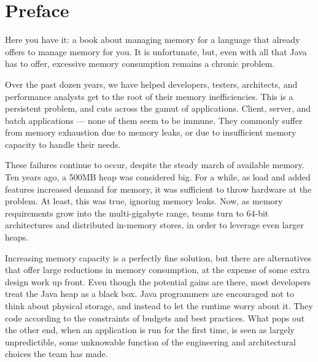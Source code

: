 \chapter*{Preface}
\label{chapter:preface}

Here you have it: a book about managing memory for a language that already
offers to manage memory for you. It is unfortunate, but, even with all that Java
has to offer, excessive memory consumption remains a chronic problem.

Over the past dozen years, we have helped developers, testers, architects, and
performance analysts get to the root of their memory inefficiencies.
This is a persistent problem, and cuts across the gamut of applications.
Client, server, and batch applications --- none of them seem to be immune. They
commonly suffer from memory exhaustion due to memory leaks, or due to
insufficient memory capacity to handle their needs.

These failures continue to occur, despite the steady march of available memory.
Ten years ago, a 500MB heap was considered big. For a while, as load and added
features increased demand for memory, it was sufficient to throw hardware at the
problem. At least, this was true, ignoring memory leaks.
Now, as memory requirements grow into the multi-gigabyte range, teams turn to
64-bit architectures and distributed in-memory stores, in order to leverage even
larger heaps.






Increasing memory capacity is a perfectly fine solution, but there are
alternatives that offer large reductions in memory consumption, at the expense
of some extra design work up front. Even though the potential gains are there,
most developers treat the Java heap as a black box.
Java programmers are encouraged not to think about physical storage, and instead
to let the runtime worry about it. They code according to the constraints of
budgets and best practices. What pops out the other end, when an application is
run for the first time, is seen as largely unpredictible, some unknowable
function of the engineering and architectural choices the team has made.

